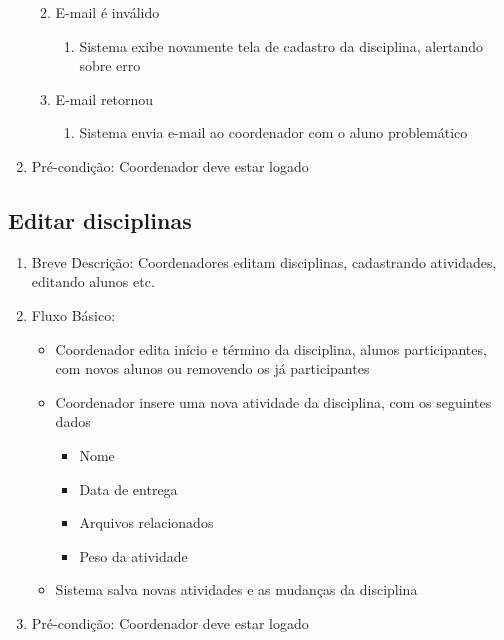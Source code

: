 \begin{enumerate}
\begin{enumerate}
\begin{enumerate}
        \end{enumerate}
        \item E-mail é inválido
        \begin{enumerate}
            \item Sistema exibe novamente tela de cadastro da disciplina, alertando sobre erro
        \end{enumerate}
        \item E-mail retornou
        \begin{enumerate}
            \item Sistema envia e-mail ao coordenador com o aluno problemático
        \end{enumerate}
    \end{enumerate}
    \item Pré-condição: Coordenador deve estar logado
\end{enumerate}

\subsection{Editar disciplinas}
\begin{enumerate}
    \item Breve Descrição: Coordenadores editam disciplinas, cadastrando atividades, editando alunos etc.
    \item Fluxo Básico:
        \begin{itemize}
            \item Coordenador edita início e término da disciplina, alunos participantes, com novos alunos ou removendo os já participantes
            \item Coordenador insere uma nova atividade da disciplina, com os seguintes dados
            \begin{itemize}
                \item Nome
                \item Data de entrega
                \item Arquivos relacionados
                \item Peso da atividade
            \end{itemize}
            \item Sistema salva novas atividades e as mudanças da disciplina
        \end{itemize}
    \item Pré-condição: Coordenador deve estar logado
\end{enumerate}

